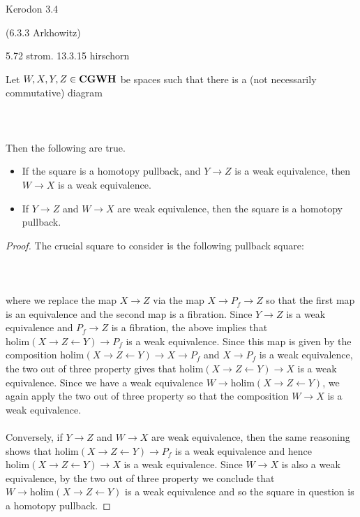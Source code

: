 \documentclass[a4paper]{article}
\begin{document}
Kerodon 3.4

 (6.3.3 Arkhowitz)

5.72 strom. 13.3.15 hirschorn

\begin{prp}{}{} Let $W,X,Y,Z\in\bold{CGWH}$ be spaces such that there is a (not necessarily commutative) diagram \\~\\
\\~\\
Then the following are true. 
\begin{itemize}
\item If the square is a homotopy pullback, and $Y\to Z$ is a weak equivalence, then $W\to X$ is a weak equivalence. 
\item If $Y\to Z$ and $W\to X$ are weak equivalence, then the square is a homotopy pullback. 
\end{itemize} \tcbline
\begin{proof}
The crucial square to consider is the following pullback square: \\~\\
\\~\\
where we replace the map $X\to Z$ via the map $X\to P_f\to Z$ so that the first map is an equivalence and the second map is a fibration. Since $Y\to Z$ is a weak equivalence and $P_f\to Z$ is a fibration, the above implies that $\text{holim}(X\rightarrow Z\leftarrow Y)\to P_f$ is a weak equivalence. Since this map is given by the composition $\text{holim}(X\rightarrow Z\leftarrow Y)\to X\to P_f$ and $X\to P_f$ is a weak equivalence, the two out of three property gives that $\text{holim}(X\rightarrow Z\leftarrow Y)\to X$ is a weak equivalence. Since we have a weak equivalence $W\to\text{holim}(X\rightarrow Z\leftarrow Y)$, we again apply the two out of three property so that the composition $W\to X$ is a weak equivalence. \\~\\

Conversely, if $Y\to Z$ and $W\to X$ are weak equivalence, then the same reasoning shows that $\text{holim}(X\rightarrow Z\leftarrow Y)\to P_f$ is a weak equivalence and hence $\text{holim}(X\rightarrow Z\leftarrow Y)\to X$ is a weak equivalence. Since $W\to X$ is also a weak equivalence, by the two out of three property we conclude that $W\to\text{holim}(X\rightarrow Z\leftarrow Y)$ is a weak equivalence and so the square in question is a homotopy pullback. 
\end{proof}
\end{prp}
\end{document}
